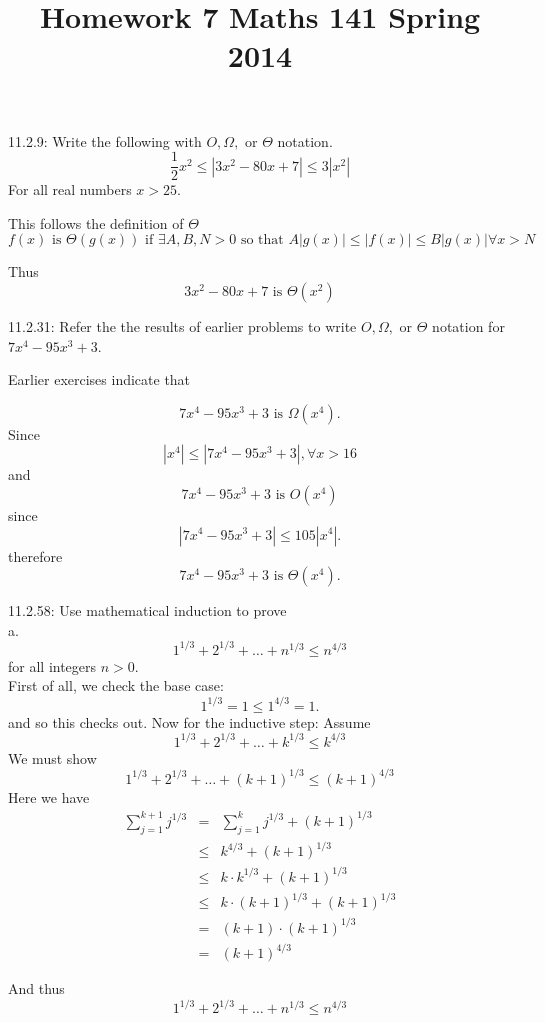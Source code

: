\documentclass[16 pt]{amsart}
\theoremstyle{definition}
\theoremstyle{remark}
\numberwithin{equation}{subsection}
\begin{document}
\title{Homework 7 Maths 141 Spring 2014}
\maketitle 

11.2.9: Write the following with $O, \Omega,$ or $\Theta$ notation.\\
\[
\frac{1}{2}x^2 \leq |3x^2-80x+7| \leq 3|x^2|
\]
For all real numbers $x>25$.


This follows the definition of $\Theta$
\[
f(x) \text{ is } \Theta(g(x)) \text{ if } \exists A,B,N>0 \text{ so that } A|g(x)| \leq |f(x)| \leq B|g(x)| \forall x>N
\]


Thus 
\[
3x^2-80x+7 \text{ is } \Theta(x^2)
\]

\newpage

11.2.31: Refer the the results of earlier problems to write $O,\Omega,$ or $\Theta$ notation for $7x^4-95x^3+3$.

Earlier exercises indicate that

\[
7x^4-95x^3+3 \text { is } \Omega(x^4).
\]
Since 
\[
|x^4|\leq |7x^4-95x^3+3|, \forall x> 16
\]
and
\[
7x^4-95x^3+3 \text { is } O(x^4)
\]
since
\[
|7x^4-95x^3+3|\leq 105 |x^4|.
\]
therefore
\[
7x^4-95x^3+3 \text { is } \Theta(x^4).
\]




\newpage

11.2.58: Use mathematical induction to prove\\

a. 
\[
1^{1/3} + 2^{1/3} + \dots + n^{1/3} \leq n^{4/3}
\]
for all integers $n>0$.\\


First of all, we check the base case:
\[
1^{1/3} = 1 \leq 1^{4/3} =1.
\]
and so this checks out.
Now for the inductive step:  Assume
\[
1^{1/3} + 2^{1/3} + \dots + k^{1/3} \leq k^{4/3}
\]
We must show
\[
1^{1/3} + 2^{1/3} + \dots + (k+1)^{1/3} \leq (k+1)^{4/3}
\]
Here we have 
\begin{eqnarray*}
\sum_{j=1}^{k+1} j^{1/3}& =& \sum_{j=1}^{k} j^{1/3} + (k+1)^{1/3}\\
& \leq & k^{4/3} + (k+1)^{1/3}\\
& \leq & k\cdot k^{1/3} + (k+1)^{1/3}\\
& \leq & k\cdot (k+1)^{1/3} + (k+1)^{1/3}\\
& = & (k+1)\cdot (k+1)^{1/3}\\
& = & (k+1)^{4/3} 
\end{eqnarray*}


And thus
\[
1^{1/3} + 2^{1/3} + \dots + n^{1/3} \leq n^{4/3}
\]
\end{document}
